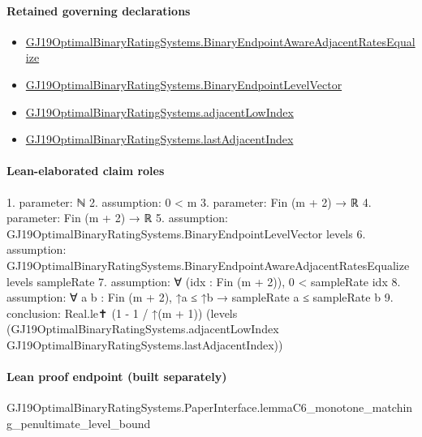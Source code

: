 \documentclass[10pt]{article}
\begin{document}
\paragraph{Retained governing declarations}
\begin{itemize}\raggedright
\item \hyperlink{governing-declaration-5a62c276eedad684}{GJ19\allowbreak{}Optimal\allowbreak{}Binary\allowbreak{}Rating\allowbreak{}Systems.\allowbreak{}Binary\allowbreak{}Endpoint\allowbreak{}Aware\allowbreak{}Adjacent\allowbreak{}Rates\allowbreak{}Equalize}
\item \hyperlink{governing-declaration-aa797f827cdcda67}{GJ19\allowbreak{}Optimal\allowbreak{}Binary\allowbreak{}Rating\allowbreak{}Systems.\allowbreak{}Binary\allowbreak{}Endpoint\allowbreak{}Level\allowbreak{}Vector}
\item \hyperlink{governing-declaration-6d6631db7a243715}{GJ19\allowbreak{}Optimal\allowbreak{}Binary\allowbreak{}Rating\allowbreak{}Systems.\allowbreak{}adjacent\allowbreak{}Low\allowbreak{}Index}
\item \hyperlink{governing-declaration-52fd1b4c72f89380}{GJ19\allowbreak{}Optimal\allowbreak{}Binary\allowbreak{}Rating\allowbreak{}Systems.\allowbreak{}last\allowbreak{}Adjacent\allowbreak{}Index}
\end{itemize}
\paragraph{Lean-elaborated claim roles}\begin{ReviewVerbatim}
1. parameter: ℕ
2. assumption: 0 < m
3. parameter: Fin (m + 2) → ℝ
4. parameter: Fin (m + 2) → ℝ
5. assumption: GJ19OptimalBinaryRatingSystems.BinaryEndpointLevelVector levels
6. assumption: GJ19OptimalBinaryRatingSystems.BinaryEndpointAwareAdjacentRatesEqualize levels sampleRate
7. assumption: ∀ (idx : Fin (m + 2)), 0 < sampleRate idx
8. assumption: ∀ {a b : Fin (m + 2)}, ↑a ≤ ↑b → sampleRate a ≤ sampleRate b
9. conclusion: Real.le✝ (1 - 1 / ↑(m + 1))
  (levels (GJ19OptimalBinaryRatingSystems.adjacentLowIndex GJ19OptimalBinaryRatingSystems.lastAdjacentIndex))
\end{ReviewVerbatim}

\paragraph{Lean proof endpoint (built separately)}\begin{ReviewVerbatim}
GJ19OptimalBinaryRatingSystems.PaperInterface.lemmaC6_monotone_matching_penultimate_level_bound
\end{ReviewVerbatim}
\end{document}
